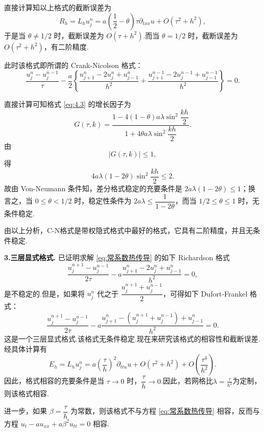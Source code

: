     直接计算知以上格式的截断误差为
    \begin{equation*}
        R_h = L_h u_j^n = a\left(\frac{1}{2} - \theta\right)\tau \partial_{txx} u + O(\tau^2 + h^2),
    \end{equation*}
    于是当 $\theta \neq 1/2$ 时，截断误差为 $O(\tau + h^2)$.而当 $\theta = 1/2$ 时，截断误差为 $O(\tau^2 + h^2)$，有二阶精度.
    
    此时该格式即所谓的 Crank-Nicolson 格式：
    \begin{equation*}
        \frac{u_j^n - u_j^{n-1}}{\tau} - \frac{a}{2} \left\{ \frac{u_{j+1}^n - 2u_j^n + u_{j-1}^n}{h^2} + \frac{u_{j+1}^{n-1} - 2u_j^{n-1} + u_{j-1}^{n-1}}{h^2} \right\} = 0.
    \end{equation*}

    直接计算可知格式 \eqref{eq:4.3} 的增长因子为
    \begin{equation*}
        G(\tau, k) = \frac{1 - 4(1 - \theta)a\lambda \sin^2 \dfrac{kh}{2}}{1 + 4\theta a\lambda \sin^2 \dfrac{kh}{2}}.
    \end{equation*}
    由
    \begin{equation*}
        |G(\tau, k)| \leq 1,
    \end{equation*}
得
    \begin{equation*}
        4a\lambda(1 - 2\theta)\sin^2 \frac{kh}{2} \leq 2.
    \end{equation*}
故由 Von-Neumann 条件知，差分格式稳定的充要条件是 $2a\lambda(1 - 2\theta) \leq 1$；换言之，当 $0 \leq \theta < 1/2$ 时，稳定性条件为 $2a\lambda \leq \dfrac{1}{1 - 2\theta}$，而当 $1/2 \leq \theta \leq 1$ 时，无条件稳定.\par
    由以上分析，C-N格式是带权隐式格式中最好的格式，它具有二阶精度，并且无条件稳定.

\noindent\textbf{3.三层显式格式.} 已证明求解 \eqref{eq:常系数热传导} 的如下 Richardson 格式
    \begin{equation*}
        \frac{u_j^{n+1} - u_j^{n-1}}{2\tau} - a \frac{u_{j+1}^n - 2u_j^n + u_{j-1}^n}{h^2} = 0,
    \end{equation*}
    是不稳定的.但是，如果将 $u_j^n$ 代之于 $\dfrac{u_j^{n+1} + u_j^{n-1}}{2}$，可得如下 Dufort-Frankel 格式：
    \begin{equation*}
        \frac{u_j^{n+1} - u_j^{n-1}}{2\tau} - a \frac{u_{j+1}^n - (u_j^{n+1} + u_j^{n-1}) + u_{j-1}^n}{h^2} = 0.
    \end{equation*}
    这是一个三层显式格式.该格式无条件稳定.现在来研究该格式的相容性和截断误差.
    经具体计算有
    \begin{equation*}
        E_h = L_h u_j^n = a\left(\frac{\tau}{h}\right)^2 \partial_{ttu} u + O(\tau^2 + h^2) + O\left(\frac{\tau^4}{h^2}\right).
    \end{equation*}
    因此，格式相容的充要条件是当 $\tau \to 0$ 时，$\dfrac{\tau}{h} \to 0$.因此，若网格比$\lambda=\frac{\tau}{h^2}$为定制，则该格式相容.\par
    进一步，如果 $\beta = \dfrac{\tau}{h}$ 为常数，则该格式不与方程 \eqref{eq:常系数热传导} 相容，反而与方程 $u_t - au_{xx} + a\beta^2 u_{tt} = 0$ 相容.

